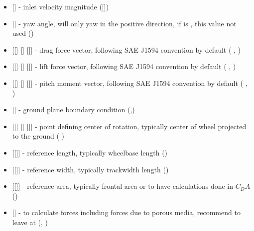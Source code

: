 \begin{itemize}
    \item {} [] - inlet velocity magnitude ([])
    
    \item {} [] - yaw angle, will only yaw in the positive direction, if  is , this value not used ()
    
    \item {} [[] [] []] - drag force vector, following SAE J1594 convention by default (  , )
    
    \item {} [[] [] []] - lift force vector, following SAE J1594 convention by default (  , )
    
    \item {} [[] [] []] - pitch moment vector, following SAE J1594 convention by default (  , )
    
    \item {} [] - ground plane boundary condition (,)
    
    \item {} [[] [] []] - point defining center of rotation, typically center of wheel projected to the ground (  )
    
    \item {} [[]] - reference length, typically wheelbase length ()
    
    \item {} [[]] - reference width, typically trackwidth length ()
    
    \item {} [[]] - reference area, typically frontal area or  to have calculations done in \(C_{D}A\) ()
    
    \item {} [] - to calculate forces including forces due to porous media, recommend to leave at  (, )
    

\end{itemize}
